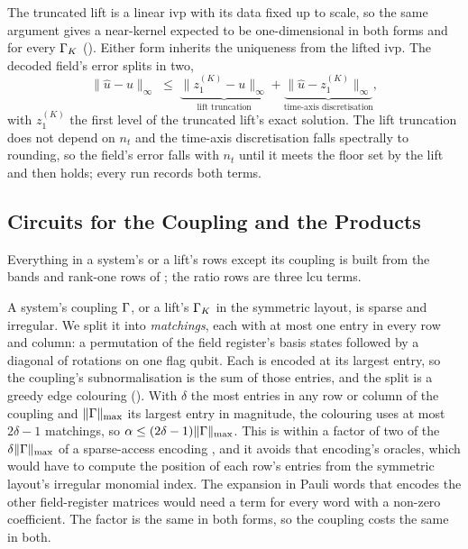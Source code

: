 The truncated lift is a linear \gls{ivp} with its data fixed up to scale, so the same argument gives a near-kernel expected to be one-dimensional in both forms and for every $\Gamma_K$ (). Either form inherits the uniqueness from the lifted \gls{ivp}. The decoded field's error splits in two,
\begin{equation}
    \|\hat u-u\|_\infty\;\le\;\underbrace{\bigl\|z^{(K)}_1-u\bigr\|_\infty}_{\text{lift truncation}}+\underbrace{\bigl\|\hat u-z^{(K)}_1\bigr\|_\infty}_{\text{time-axis discretisation}},
    \label{eq:carleman-error}
\end{equation}
with $z^{(K)}_1$ the first level of the truncated lift's exact solution. The lift truncation does not depend on $n_t$ and the time-axis discretisation falls spectrally to rounding, so the field's error falls with $n_t$ until it meets the floor set by the lift and then holds; every run records both terms.

\subsection{Circuits for the Coupling and the Products}
\label{sec:ext-circuits}

Everything in a system's or a lift's rows except its coupling is built from the bands and rank-one rows of ; the ratio rows are three \gls{lcu} terms.

A system's coupling $\Gamma$, or a lift's $\Gamma_K$ in the symmetric layout, is sparse and irregular. We split it into \emph{matchings}, each with at most one entry in every row and column: a permutation of the field register's basis states followed by a diagonal of rotations on one flag qubit. Each is encoded at its largest entry, so the coupling's subnormalisation is the sum of those entries, and the split is a greedy edge colouring (). With $\delta$ the most entries in any row or column of the coupling and $\|\Gamma\|_{\max}$ its largest entry in magnitude, the colouring uses at most $2\delta-1$ matchings, so $\alpha\le(2\delta-1)\|\Gamma\|_{\max}$. This is within a factor of two of the $\delta\|\Gamma\|_{\max}$ of a sparse-access encoding \cite{gilyen2019qsvt}, and it avoids that encoding's oracles, which would have to compute the position of each row's entries from the symmetric layout's irregular monomial index. The expansion in Pauli words that encodes the other field-register matrices would need a term for every word with a non-zero coefficient. The factor is the same in both forms, so the coupling costs the same in both.

